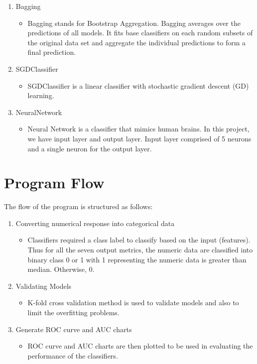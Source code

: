 \begin{enumerate}
\begin{itemize}
        \end{itemize}
    \item Bagging
        \begin{itemize}
            \item Bagging stands for Bootstrap Aggregation. Bagging averages over the predictions of all models. It fits base classifiers on each random subsets of the original data set and aggregate the individual predictions to form a final prediction.
        \end{itemize}
    \item SGDClassifier
        \begin{itemize}
            \item SGDClassifier is a linear classifier with stochastic gradient descent (GD) learning. 
        \end{itemize}
    \item NeuralNetwork
        \begin{itemize}
            \item Neural Network is a classifier that mimics human brains. In this project, we have input layer and output layer. Input layer comprised of 5 neurons and a single neuron for the output layer.
        \end{itemize}
\end{enumerate}

\section{Program Flow}

The flow of the program is structured as follows:

\begin{enumerate}
    \item Converting numerical response into categorical data
        \begin{itemize}
            \item Classifiers required a class label to classify based on the input (features). Thus for all the seven output metrics, the numeric data are classified into binary class 0 or 1 with 1 representing the numeric data is greater than median. Otherwise, 0. 
        \end{itemize}
    \item Validating Models
        \begin{itemize}
            \item K-fold cross validation method is used to validate models and also to limit the overfitting problems.
        \end{itemize}
    \item Generate ROC curve and AUC charts
        \begin{itemize}
            \item ROC curve and AUC charts are then plotted to be used in evaluating the performance of the classifiers.
        \end{itemize}
\end{enumerate}
